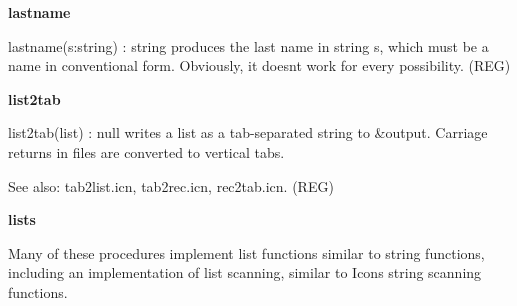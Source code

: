 {\sffamily\bfseries
lastname}

\textsf{lastname(s:string) : string} produces the last name in string
\textsf{s}, which must be a name in conventional form. Obviously, it
doesn{\textquotesingle}t work for every possibility. (REG)

{\sffamily\bfseries
list2tab}

\textsf{list2tab(list) : null} writes a list as a tab-separated string
to \textsf{\&output}. Carriage returns in files are converted to
vertical tabs.

See also: tab2list.icn, tab2rec.icn, rec2tab.icn. (REG)

{\sffamily\bfseries
lists}

Many of these procedures implement list functions
similar to string functions, including an implementation of
list scanning, similar to Icon{\textquotesingle}s
string scanning functions.

